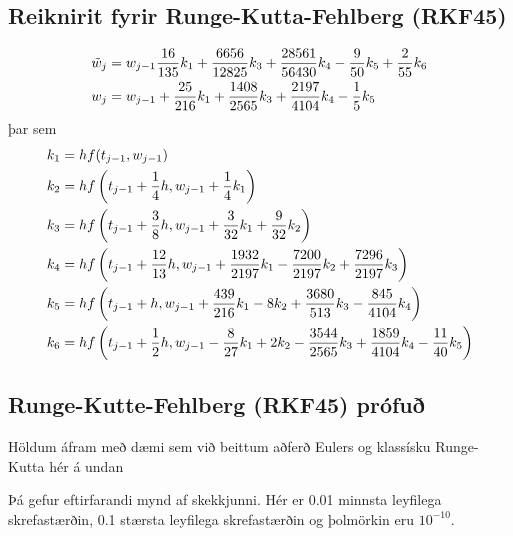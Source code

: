 \documentclass[letterpaper,10pt,icelandic]{sphinxmanual}
\begin{document}

\subsection{Reiknirit fyrir Runge-Kutta-Fehlberg (RKF45)}
\label{kafli06:index-15}\label{kafli06:reiknirit-fyrir-runge-kutta-fehlberg-rkf45}\begin{gather}
\begin{split}\begin{aligned}
  \tilde w_j &= w_{j-1} \frac{16}{135} k_1 + \frac{6656}{12825}k_3 + \frac{28561}{56430}k_4
  - \frac{9}{50}k_5 + \frac{2}{55}k_6\\
  w_j &= w_{j-1} + \frac{25}{216}k_1 + \frac{1408}{2565}k_3 + \frac{2197}{4104}k_4 - \frac 15 k_5
 \end{aligned}\end{split}\notag
\end{gather}
þar sem
\begin{gather}
\begin{split}\begin{aligned}
  k_1 &= hf(t_{j-1},w_{j-1}) \\
  k_2 &= hf\left( t_{j-1}+\frac 14h, w_{j-1}+\frac 14k_1          \right)\\
  k_3 &= hf\left( t_{j-1}+\frac 38h, w_{j-1}+\frac 3{32}k_1 + \frac 9{32}k_2\right)\\
  k_4 &= hf\left( t_{j-1}+\frac{12}{13}h, w_{j-1} + \frac{1932}{2197}k_1
  - \frac{7200}{2197}k_2 + \frac{7296}{2197}k_3 \right)\\
  k_5 &= hf\left( t_{j-1} +h, w_{j-1} + \frac{439}{216}k_1 - 8k_2+\frac{3680}{513}k_3
  -\frac{845}{4104}k_4\right)\\
  k_6 &= hf\left( t_{j-1} +\frac 12h, w_{j-1} - \frac 8{27}k_1 + 2k_2 -\frac{3544}{2565}k_3
  +\frac{1859}{4104}k_4 - \frac{11}{40}k_5\right)\\
 \end{aligned}\end{split}\notag
\end{gather}

\subsection{Runge-Kutte-Fehlberg (RKF45) prófuð}
\label{kafli06:runge-kutte-fehlberg-rkf45-profu}
Höldum áfram með dæmi sem við beittum aðferð Eulers og
klassísku Runge-Kutta hér á undan

Þá gefur eftirfarandi mynd af skekkjunni. Hér er 0.01 minnsta leyfilega
skrefastærðin, 0.1 stærsta leyfilega skrefastærðin og þolmörkin eru
\(10^{-10}\).
\end{document}
